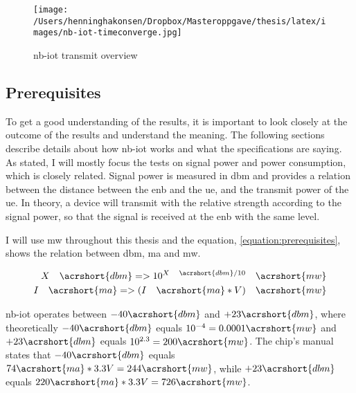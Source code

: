 \documentclass[USenglish]{ifimaster}  %
\begin{document}
\begin{figure}[ht]
  \centering\texttt{[image: /Users/henninghakonsen/Dropbox/Masteroppgave/thesis/latex/images/nb-iot-timeconverge.jpg]}
  \caption[\acrshort{nb-iot} transmit overview]{\acrshort{nb-iot} transmit overview \cite{person:ola}}
  \label{figure:nb-iot-timeconverge}
\end{figure}

\subsection{Prerequisites} \label{ssection:prerequisites}
To get a good understanding of the results, it is important to look closely at the outcome of the results and understand the meaning. The following sections describe details about how \acrshort{nb-iot} works and what the specifications are saying. As stated, I will mostly focus the tests on signal power and power consumption, which is closely related. Signal power is measured in \acrfull{dbm} and provides a relation between the distance between the \acrshort{enb} and the \acrshort{ue}, and the transmit power of the \acrshort{ue}. In theory, a device will transmit with the relative strength according to the signal power, so that the signal is received at the \acrshort{enb} with the same level.

I will use \acrshort{mw} throughout this thesis and the equation, \vref{equation:prerequisites}, shows the relation between \acrfull{dbm}, \acrfull{ma} and \acrfull{mw}.

\begin{equation} \label{equation:prerequisites}
\begin{aligned}
  X\quad \acrshort{dbm} => 10^{X\quad \acrshort{dbm} / 10}\quad \acrshort{mw} \\
  I\quad \acrshort{ma} => (I\quad \acrshort{ma} * V)\quad \acrshort{mw} \\
\end{aligned}
\end{equation}

\acrshort{nb-iot} operates between ${-40 \acrshort{dbm}}$ and ${+23 \acrshort{dbm}}$, where theoretically ${-40 \acrshort{dbm}}$ equals ${10^{-4} = 0.0001 \acrshort{mw}}$ and ${+23 \acrshort{dbm}}$ equals ${10^{2.3} = 200 \acrshort{mw}}$.
The chip's manual states that ${-40 \acrshort{dbm}}$ equals ${74 \acrshort{ma} * 3.3V = 244 \acrshort{mw}}$, while ${+23 \acrshort{dbm}}$ equals ${220 \acrshort{ma} * 3.3V = 726 \acrshort{mw}}$.
\end{document}
